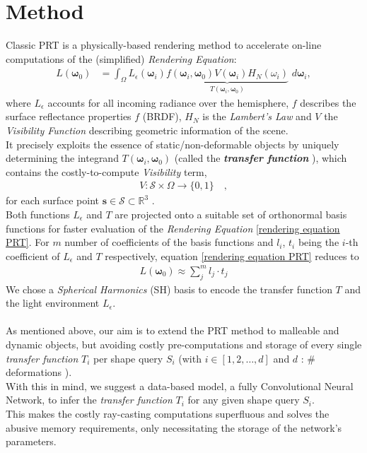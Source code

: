 \section{Method}
Classic PRT  is a physically-based rendering method to accelerate on-line computations of the (simplified) \textit{Rendering Equation}:
\begin{align}
L(\bm{\omega}_0 ) &= 
\int_{\Omega}   L_{\epsilon}(\bm{\omega}_i ) 
\underbrace{f(\bm{\omega}_i,\bm{\omega}_0) 
V(\bm{\omega}_i) H_N(\omega_i) }_{T(\bm{\omega}_i,\bm{\omega}_0) }
\,  \, d\bm{\omega}_i , 
\label{rendering equation PRT}
\end{align}
where $L_{\epsilon}$ accounts for all incoming radiance over the hemisphere, $f$  describes the surface reflectance properties $f$ (BRDF), $H_N$ is the \textit{Lambert's Law} and $V$ the \textit{Visibility Function} describing geometric information of the scene.\\
It precisely exploits the essence of static/non-deformable objects by uniquely determining the integrand $T(\bm{\omega}_i,\bm{\omega}_0)$ (called the \textbf{\textit{transfer function}} ), which contains the costly-to-compute  \textit{Visibility} term,
\begin{align*}
V :  \mathcal{S}  \times \Omega \rightarrow \{0,1\} \quad,
\end{align*}
for each surface point $\bm{s} \in \mathcal{S} \subset \mathbb{R}^3$ \cite{CohenBook}. 
\\
Both functions $L_{\epsilon} $ and $T$  are projected onto a suitable set of orthonormal basis functions for faster evaluation of the \textit{Rendering Equation} \ref{rendering equation PRT}. 
For $m$ number of coefficients of the basis functions and $l_i$, $t_i$ being the $i$-th coefficient of $L_{\epsilon} $ and $T$ respectively, equation \ref{rendering equation PRT} reduces to \cite{sloan2002precomputed} 
\begin{align}
L(\bm{\omega}_0 ) \approx \sum_{j}^{m} l_j \cdot t_j 
\label{Eq: Reduced Rendering Eq}
\end{align}
We chose a \textit{Spherical Harmonics} (SH) basis to encode the transfer function $T$ and the light environment $L_{\epsilon}$.
\\
\\
 As mentioned above, our aim is to extend the PRT method to malleable and dynamic objects, but avoiding costly pre-computations and storage of every single \textit{transfer function} $T_i$ per shape query $S_i$ (with $i \in [1,2,\dots, d]$ and $d$ : $\#$ deformations ). \\
With this in mind, we suggest a data-based model, a fully Convolutional Neural Network, to infer the \textit{transfer function} $T_i$ for any given shape query $S_i$. \\
This makes the costly ray-casting computations superfluous and solves the abusive memory requirements, only necessitating the storage of the network's parameters. 
